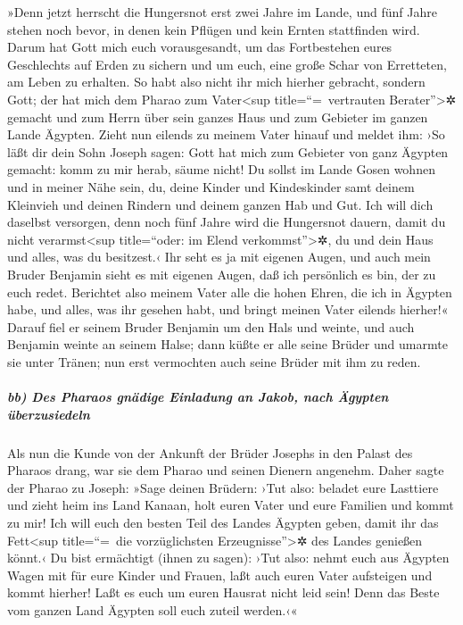  »Denn jetzt herrscht die Hungersnot erst zwei Jahre im
Lande, und fünf Jahre stehen noch bevor, in denen kein Pflügen und kein
Ernten stattfinden wird.  Darum hat Gott mich euch
vorausgesandt, um das Fortbestehen eures Geschlechts auf Erden zu
sichern und um euch, eine große Schar von Erretteten, am Leben zu
erhalten.  So habt also nicht ihr mich hierher gebracht,
sondern Gott; der hat mich dem Pharao zum Vater\textless sup
title=``=~vertrauten Berater''\textgreater✲ gemacht und zum Herrn über
sein ganzes Haus und zum Gebieter im ganzen Lande Ägypten.
 Zieht nun eilends zu meinem Vater hinauf und meldet ihm:
›So läßt dir dein Sohn Joseph sagen: Gott hat mich zum Gebieter von ganz
Ägypten gemacht: komm zu mir herab, säume nicht!  Du
sollst im Lande Gosen wohnen und in meiner Nähe sein, du, deine Kinder
und Kindeskinder samt deinem Kleinvieh und deinen Rindern und deinem
ganzen Hab und Gut.  Ich will dich daselbst versorgen,
denn noch fünf Jahre wird die Hungersnot dauern, damit du nicht
verarmst\textless sup title=``oder: im Elend verkommst''\textgreater✲,
du und dein Haus und alles, was du besitzest.‹  Ihr seht
es ja mit eigenen Augen, und auch mein Bruder Benjamin sieht es mit
eigenen Augen, daß ich persönlich es bin, der zu euch redet.
 Berichtet also meinem Vater alle die hohen Ehren, die
ich in Ägypten habe, und alles, was ihr gesehen habt, und bringt meinen
Vater eilends hierher!«  Darauf fiel er seinem Bruder
Benjamin um den Hals und weinte, und auch Benjamin weinte an seinem
Halse;  dann küßte er alle seine Brüder und umarmte sie
unter Tränen; nun erst vermochten auch seine Brüder mit ihm zu reden.

\hypertarget{bb-des-pharaos-gnuxe4dige-einladung-an-jakob-nach-uxe4gypten-uxfcberzusiedeln}{%
\subparagraph{bb) Des Pharaos gnädige Einladung an Jakob, nach Ägypten
überzusiedeln}\label{bb-des-pharaos-gnuxe4dige-einladung-an-jakob-nach-uxe4gypten-uxfcberzusiedeln}}

 Als nun die Kunde von der Ankunft der Brüder Josephs in
den Palast des Pharaos drang, war sie dem Pharao und seinen Dienern
angenehm.  Daher sagte der Pharao zu Joseph: »Sage deinen
Brüdern: ›Tut also: beladet eure Lasttiere und zieht heim ins Land
Kanaan,  holt euren Vater und eure Familien und kommt zu
mir! Ich will euch den besten Teil des Landes Ägypten geben, damit ihr
das Fett\textless sup title=``=~die vorzüglichsten
Erzeugnisse''\textgreater✲ des Landes genießen könnt.‹ 
Du bist ermächtigt (ihnen zu sagen): ›Tut also: nehmt euch aus Ägypten
Wagen mit für eure Kinder und Frauen, laßt auch euren Vater aufsteigen
und kommt hierher!  Laßt es euch um euren Hausrat nicht
leid sein! Denn das Beste vom ganzen Land Ägypten soll euch zuteil
werden.‹«

